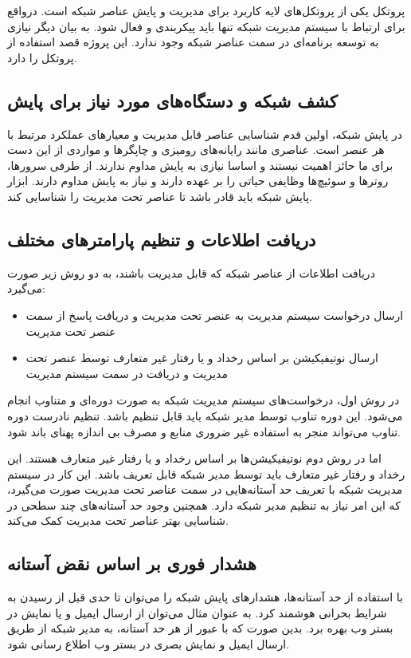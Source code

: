 پروتکل  یکی از پروتکل‌های لایه کاربرد برای مدیریت و پایش عناصر شبکه است. درواقع برای ارتباط با سیستم مدیریت شبکه تنها باید پیکربندی و فعال شود. به بیان دیگر نیازی به توسعه برنامه‌ای در سمت عناصر شبکه وجود ندارد\cite{hare2011simple}. این پروژه قصد استفاده از پروتکل  را دارد.




\subsection{کشف شبکه و دستگاه‌های مورد نیاز برای پایش}

در پایش شبکه، اولین قدم شناسایی عناصر قابل مدیریت و معیارهای عملکرد مرتبط با هر عنصر است. عناصری مانند رایانه‌های رومیزی و چاپگرها و مواردی از این دست برای ما حائز اهمیت نیستند و اساسا نیازی به پایش مداوم ندارند. از طرفی سرورها، روترها و سوئیچ‌ها وظایفی حیاتی را بر عهده دارند و نیاز به پایش مداوم دارند. ابزار پایش شبکه باید قادر باشد تا عناصر تحت مدیریت را شناسایی کند.


\subsection{دریافت اطلاعات و تنظیم پارامترهای مختلف}

دریافت اطلاعات از عناصر شبکه که قابل مدیریت باشند، به دو روش زیر صورت می‌گیرد:

\begin{itemize}
    \item ارسال درخواست سیستم مدیریت به عنصر تحت مدیریت و دریافت پاسخ از سمت عنصر تحت مدیریت
    \item ارسال نوتیفیکیشن بر اساس رخداد و یا رفتار غیر متعارف توسط عنصر تحت مدیریت و دریافت در سمت سیستم مدیریت
\end{itemize}

\newpage

در روش اول، درخواست‌های سیستم مدیریت شبکه به صورت دوره‌ای و متناوب انجام می‌شود. این دوره تناوب توسط مدیر شبکه باید قابل تنظیم باشد. تنظیم نادرست دوره تناوب می‌تواند منجر به استفاده غیر ضروری منابع و مصرف بی اندازه پهنای باند شود. 


اما در روش دوم نوتیفیکیشن‌ها بر اساس رخداد و یا رفتار غیر متعارف هستند. این رخداد و رفتار غیر متعارف باید توسط مدیر شبکه قابل تعریف باشد. این کار در سیستم مدیریت شبکه با تعریف حد آستانه‌هایی در سمت عناصر تحت مدیریت صورت می‌گیرد، که این امر نیاز به تنظیم مدیر شبکه دارد. همچنین وجود حد آستانه‌های چند سطحی در شناسایی بهتر عناصر تحت مدیریت کمک می‌کند.


\subsection{هشدار فوری بر اساس نقض آستانه}


با استفاده از حد آستانه‌ها، هشدارهای پایش شبکه را می‌توان تا حدی قبل از رسیدن به شرایط بحرانی هوشمند کرد. به عنوان مثال می‌توان از ارسال ایمیل و یا نمایش در بستر وب بهره برد. بدین صورت که با عبور از هر حد آستانه، به مدیر شبکه از طریق ارسال ایمیل و نمایش بصری در بستر وب اطلاع رسانی شود.

